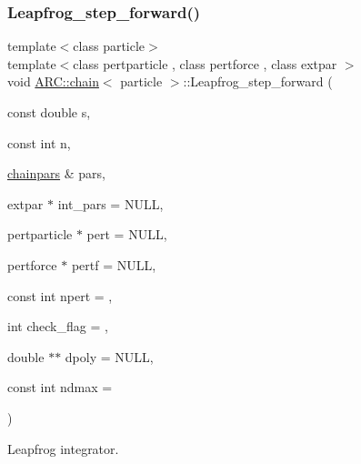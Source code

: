 \subsubsection{\texorpdfstring{Leapfrog\+\_\+step\+\_\+forward()}{Leapfrog\_step\_forward()}}
{\footnotesize\ttfamily template$<$class particle$>$ \\
template$<$class pertparticle , class pertforce , class extpar $>$ \\
void \hyperlink{classARC_1_1chain}{A\+R\+C\+::chain}$<$ particle $>$\+::Leapfrog\+\_\+step\+\_\+forward (\begin{DoxyParamCaption}\item[{const double}]{s,  }\item[{const int}]{n,  }\item[{\hyperlink{classARC_1_1chainpars}{chainpars} \&}]{pars,  }\item[{extpar $\ast$}]{int\+\_\+pars = {\ttfamily NULL},  }\item[{pertparticle $\ast$}]{pert = {\ttfamily NULL},  }\item[{pertforce $\ast$}]{pertf = {\ttfamily NULL},  }\item[{const int}]{npert = {},  }\item[{int}]{check\+\_\+flag = {},  }\item[{double $\ast$$\ast$}]{dpoly = {\ttfamily NULL},  }\item[{const int}]{ndmax = {} }\end{DoxyParamCaption})\hspace{0.3cm}{\ttfamily [inline]}}



Leapfrog integrator. 

